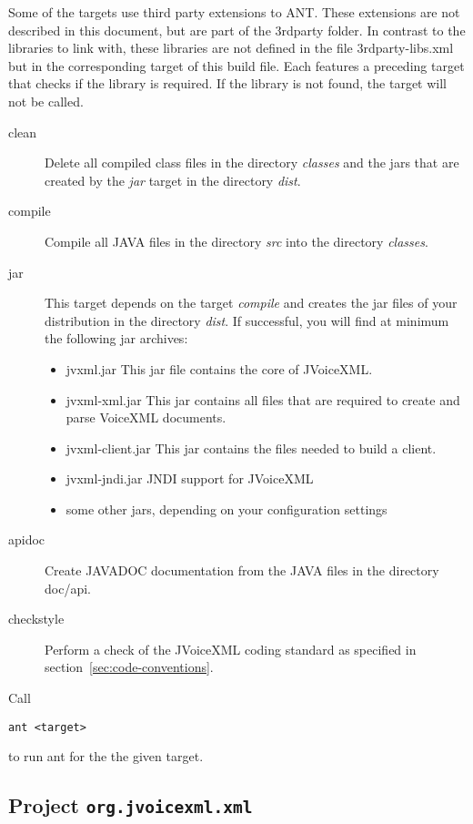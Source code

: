 \documentclass[11pt,a4paper]{article}
\begin{document}
Some of the targets use third party extensions to ANT. These 
extensions are not described in this document, but are part of
the 3rdparty folder. In contrast to the libraries to link with,
these libraries are not defined in the file 3rdparty-libs.xml
but in the corresponding target of this build file. Each features
a preceding target that checks if the library is required. If
the library is not found, the target will not be called.

\begin{description}
\item[clean]
Delete all compiled class files in the directory \emph{classes}
and the jars that are created by the \emph{jar} target in the directory 
\emph{dist}.

\item[compile]
 Compile all JAVA files in the directory \emph{src} into the directory
\emph{classes}.

\item[jar]
 This target depends on the target \emph{compile} and creates the jar
files of your distribution in the directory \emph{dist}.
If successful, you will find at minimum the following jar archives:
\begin{itemize}
\item jvxml.jar This jar file contains the core of JVoiceXML.
\item jvxml-xml.jar This jar contains all files that are required
to create and parse VoiceXML documents.
\item jvxml-client.jar This jar contains the files needed to build
a client.
\item jvxml-jndi.jar JNDI support for JVoiceXML
\item some other jars, depending on your configuration settings
\end{itemize}

\item[apidoc]
Create JAVADOC documentation from the JAVA files in the directory
doc/api.
\item[checkstyle]
Perform a check of the JVoiceXML coding standard as specified 
in section~\ref{sec:code-conventions}.
\end{description}

Call
\begin{lstlisting}
ant <target>
\end{lstlisting}
to run ant for the the given target.

\subsection{Project \lstinline{org.jvoicexml.xml}}
\end{document}

